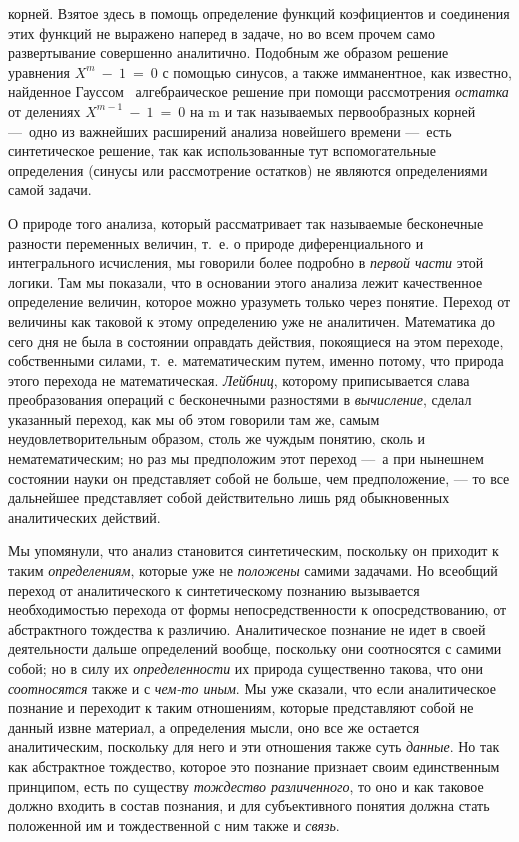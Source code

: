 \documentclass[twoside]{article}
\begin{document}
{корней. Взятое здесь в помощь определение функций коэфициентов и соединения
этих функций не выражено наперед в задаче, но во всем прочем само
развертывание совершенно аналитично. Подобным же образом
решение уравнения  $X^m~-~1~=~0$
с помощью синусов, а также имманентное, как известно,
найденное
Гауссом~\label{bkm:bm104}
алгебраическое решение при помощи рассмотрения
{\em остатка} от делениях $X^{m-1}~-~1~=~0$ на m и так называемых 
первообразных корней
—~одно из важнейших расширений анализа новейшего времени
—~есть синтетическое решение, так как использованные тут
вспомогательные определения (синусы или рассмотрение остатков) не являются
определениями самой задачи.

О природе того анализа, который рассматривает так называемые
бесконечные разности переменных величин, т.~е. о природе диференциального и
интегрального исчисления, мы говорили более подробно в
{\em первой части} этой
логики. Там мы показали, что в основании этого анализа лежит качественное
определение величин, которое можно уразуметь только через понятие. Переход
от величины как таковой к этому определению уже не аналитичен. Математика
до сего дня не была в состоянии оправдать действия, покоящиеся на этом
переходе, собственными силами, т.~е. математическим путем, именно потому,
что природа этого перехода не математическая.
{\em Лейбниц}, которому
приписывается слава преобразования операций с бесконечными разностями в
{\em вычисление}, сделал
указанный переход, как мы об этом говорили там же, самым
неудовлетворительным образом, столь же чуждым понятию, сколь и
нематематическим; но раз мы предположим этот переход —~а при
нынешнем состоянии науки он представляет собой не больше, чем
предположение, — то все дальнейшее представляет собой
действительно лишь ряд обыкновенных аналитических действий.

Мы упомянули, что анализ становится синтетическим, поскольку
он приходит к таким {\em определениям},
которые уже не
{\em положены} самими
задачами. Но всеобщий переход от аналитического к синтетическому познанию
вызывается необходимостью перехода от формы непосредственности к
опосредствованию, от абстрактного тождества к различию. Аналитическое
познание не идет в своей деятельности дальше определений вообще, поскольку
они соотносятся с самими собой; но в силу их
{\em определенности} их
природа существенно такова, что они
{\em соотносятся} также и
с {\em чем-то иным}.
Мы уже сказали, что если аналитическое познание и переходит к
таким отношениям, которые представляют собой не данный извне материал, а
определения мысли, оно все же остается аналитическим, поскольку для него и
эти отношения также суть {\em данные}.
Но так как абстрактное тождество, которое это познание
признает своим единственным принципом, есть по существу
{\em тождество различенного},
то оно и как таковое должно входить в состав
познания, и для субъективного понятия должна стать положенной им и
тождественной с ним также и
{\em связь}.

}
\end{document}
